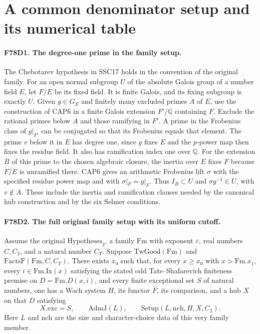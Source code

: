 \section{A common denominator setup and its numerical table}

\paragraph{F78D1. The degree-one prime in the family setup.}
The Chebotarev hypothesis in SSC17 holds in the convention of the
original family. For an open normal subgroup $U$ of the absolute
Galois group of a number field $E$, let $F/E$ be its fixed field.
It is finite Galois, and its fixing subgroup is exactly $U$.
Given $g\in G_E$ and finitely many excluded primes $A$ of $E$,
use the construction of CAP6 in a finite Galois extension
$F'/\mathbb Q$ containing $F$. Exclude the rational primes below
$A$ and those ramifying in $F'$. A prime in the Frobenius class of
$g|_{F'}$ can be conjugated so that its Frobenius equals that
element. The prime $v$ below it in $E$ has degree one, since
$g$ fixes $E$ and the $p$-power map then fixes the residue field.
It also has ramification index one over $\mathbb Q$. For the
extension $B$ of this prime to the chosen algebraic closure, the
inertia over $E$ fixes $F$ because $F/E$ is unramified there.
CAP6 gives an arithmetic Frobenius lift $\sigma$ with the
specified residue power map and with $\sigma|_F=g|_F$. Thus
$I_B\subset U$ and $\sigma g^{-1}\in U$, with $v\notin A$.
These include the inertia and ramification clauses needed by
the canonical hub construction and by the six Selmer conditions.

\paragraph{F78D2. The full original family setup with its uniform cutoff.}
Assume the original $\mathrm{Hypotheses}_2$, a family $\mathrm{Fm}$
with exponent $\varepsilon$, real numbers $C,C_2$, and a natural
number $C_T$. Suppose $\mathrm{TwGood}(\mathrm{Fm})$ and
$\mathrm{FactsF}(\mathrm{Fm},C,C_T)$. There exists $x_0$ such
that, for every $x\ge x_0$ with $x>\mathrm{Fm}.x_1$, every
$i\in\mathrm{Fm}.\mathrm{Ix}(x)$ satisfying the stated odd
Tate--Shafarevich finiteness premise on $D=\mathrm{Fm}.D(x,i)$,
and every finite exceptional set $S$ of natural numbers, one has
a Wach system $H$, its functor $F$, its comparison, and a hub
$X$ on that $D$ satisfying
\[
 X.\mathrm{exc}=S,\qquad \mathrm{AdmJ}(L),\qquad
 \mathrm{Setup}(L,\mathrm{nch},H,X,C_2).
\]
Here $L$ and $\mathrm{nch}$ are the size and character-choice data
of this very family member.


